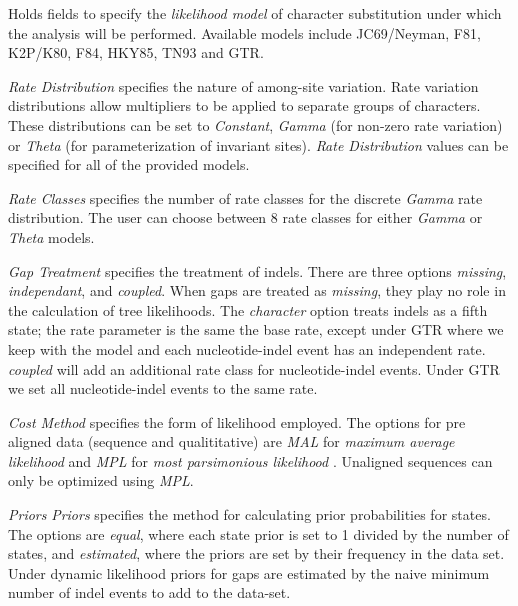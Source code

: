 \begin{description}
\setlength{\parindent}{0.5cm}
	\item[Likelihood Model Parameters]
     		   Holds fields to specify the \emph{likelihood model} of character substitution under which 
		   the analysis will be performed.  Available models include JC69/Neyman, F81, K2P/K80, F84, 
		   HKY85, TN93 and GTR. 
		   
		   \indent \emph{Rate Distribution} specifies the nature of among-site variation. 
		   Rate variation distributions allow multipliers to be applied to separate groups of characters. 
		   These distributions can be set to \emph{Constant}, \emph{Gamma} (for non-zero 
		   rate variation) or  \emph{Theta} (for parameterization of invariant sites).  \emph{Rate Distribution} 
		   values can be specified for all of the provided models.
		   
		   \indent \emph{Rate Classes} specifies the number of rate classes for the discrete \emph{Gamma}
		   rate distribution. The user can choose between 8 rate classes for either \emph{Gamma} or \emph{Theta}
		   models.
		   
		   \indent \emph{Gap Treatment}  specifies the treatment of indels. There are three options \emph{missing},
		   \emph{independant}, and \emph{coupled}. When gaps are treated as \emph{missing}, they play no role 
		   in the calculation of tree likelihoods. The \emph{character} option
           treats indels as a fifth state; the rate parameter is the same the
           base rate, except under GTR where we keep with the model and each
           nucleotide-indel event has an independent rate. \emph{coupled} will
           add an additional rate class for nucleotide-indel events. Under GTR
           we set all nucleotide-indel events to the same rate.
           
		   \indent \emph{Cost Method} specifies the form of likelihood employed.
           The options for pre aligned data (sequence and qualititative) are
           \emph{MAL} for \emph{maximum average likelihood} and \emph{MPL} for
           \emph{most parsimonious likelihood} \cite{barryandhartigan1987}.
           Unaligned sequences can only be optimized using \emph{MPL}.
		   
		   \indent \emph{Priors} \emph{Priors} specifies the method for calculating prior probabilities for states.  
		   The options are \emph{equal}, where each state prior is set to 1 divided by the number of states, and 
		   \emph{estimated}, where the priors are set by their frequency in the
           data set. Under dynamic likelihood priors for gaps are estimated 
		   by the naive minimum number of indel events to add to the data-set.


\end{description}

